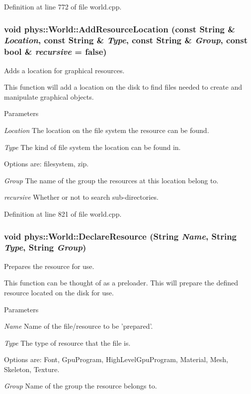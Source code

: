 Definition at line 772 of file world.cpp.

\hypertarget{classphys_1_1World_ab26033088abe4d60a40cf770dd1b0de8}{
\subsubsection[{AddResourceLocation}]{\setlength{\rightskip}{0pt plus 5cm}void phys::World::AddResourceLocation (const {\bf String} \& {\em Location}, \/  const {\bf String} \& {\em Type}, \/  const {\bf String} \& {\em Group}, \/  const bool \& {\em recursive} = {\ttfamily false})}}
\label{da/ddf/classphys_1_1World_ab26033088abe4d60a40cf770dd1b0de8}


Adds a location for graphical resources. 

This function will add a location on the disk to find files needed to create and manipulate graphical objects. 
\begin{DoxyParams}{Parameters}
\item[{\em Location}]The location on the file system the resource can be found. \item[{\em Type}]The kind of file system the location can be found in. \par
 Options are: filesystem, zip. \item[{\em Group}]The name of the group the resources at this location belong to. \item[{\em recursive}]Whether or not to search sub-\/directories. \end{DoxyParams}


Definition at line 821 of file world.cpp.

\hypertarget{classphys_1_1World_ad8c9834c1b9a0de437a0b29f17c0c48e}{
\subsubsection[{DeclareResource}]{\setlength{\rightskip}{0pt plus 5cm}void phys::World::DeclareResource ({\bf String} {\em Name}, \/  {\bf String} {\em Type}, \/  {\bf String} {\em Group})}}
\label{da/ddf/classphys_1_1World_ad8c9834c1b9a0de437a0b29f17c0c48e}


Prepares the resource for use. 

This function can be thought of as a preloader. This will prepare the defined resource located on the disk for use. 
\begin{DoxyParams}{Parameters}
\item[{\em Name}]Name of the file/resource to be 'prepared'. \item[{\em Type}]The type of resource that the file is. \par
 Options are: Font, GpuProgram, HighLevelGpuProgram, Material, Mesh, Skeleton, Texture. \item[{\em Group}]Name of the group the resource belongs to. \end{DoxyParams}


